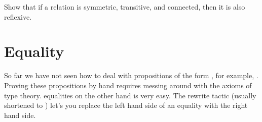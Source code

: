 \documentclass[letterpaper,10pt,english]{sphinxmanual}
\begin{document}
\sphinxAtStartPar
Show that if a relation is symmetric, transitive, and connected,
then it is also reflexive.

\begin{sphinxVerbatim}[commandchars=\\\{\}]
 

   

 
        
               
                    
          
        
\end{sphinxVerbatim}


\section{Equality}
\label{\detokenize{day2:equality}}
\sphinxAtStartPar
So far we have not seen how to deal with propositions of the form , for example, . Proving these propositions by hand requires messing around with the axioms of type theory.
 equalities on the other hand is very easy. The rewrite tactic (usually shortened to ) let’s you replace the left hand side of an equality with the right hand side.
\end{document}
